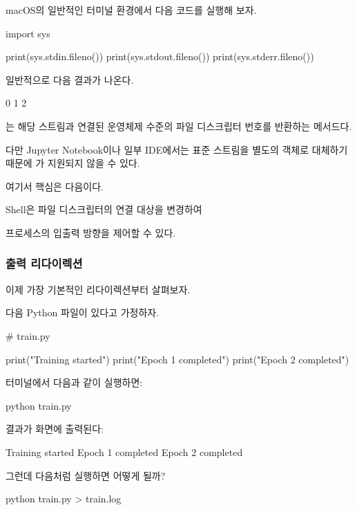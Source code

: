 macOS의 일반적인 터미널 환경에서 다음 코드를 실행해 보자.

\begin{dhkcode}
import sys

print(sys.stdin.fileno())
print(sys.stdout.fileno())
print(sys.stderr.fileno())
\end{dhkcode}

일반적으로 다음 결과가 나온다.

\begin{dhkzsh}
0
1
2
\end{dhkzsh}

는 해당 스트림과 연결된 운영체제 수준의 파일 디스크립터 번호를 반환하는 메서드다.

다만 Jupyter Notebook이나 일부 IDE에서는 표준 스트림을 별도의 객체로 대체하기 때문에 가 지원되지 않을 수 있다.

여기서 핵심은 다음이다.

\begin{dhksmry}[centered]
Shell은 파일 디스크립터의 연결 대상을 변경하여

프로세스의 입출력 방향을 제어할 수 있다.
\end{dhksmry}

\subsubsection{출력 리다이렉션 \zsh{>}}

이제 가장 기본적인 리다이렉션부터 살펴보자.

다음 Python 파일이 있다고 가정하자.

\begin{dhkcode}
# train.py

print("Training started")
print("Epoch 1 completed")
print("Epoch 2 completed")
\end{dhkcode}

터미널에서 다음과 같이 실행하면:

\begin{dhkzsh}
python train.py
\end{dhkzsh}

결과가 화면에 출력된다:

\begin{dhkzsh}
Training started
Epoch 1 completed
Epoch 2 completed
\end{dhkzsh}

그런데 다음처럼 실행하면 어떻게 될까?

\begin{dhkzsh}
python train.py > train.log
\end{dhkzsh}

